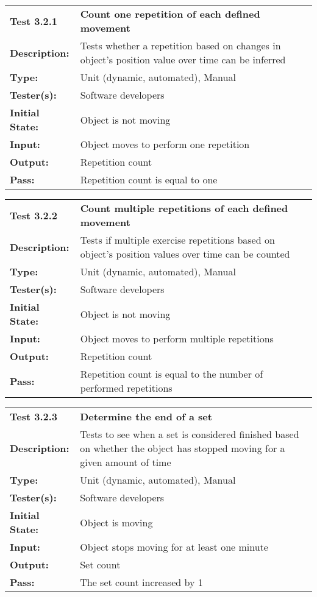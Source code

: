 \documentclass{article}
\newenvironment{testcase}
    {
    \begin{center}
    \begin{mdframed}[
        userdefinedwidth=15.5cm,
        leftmargin=1cm,
        rightmargin=1cm
        ]
    \begin{tabular}{p{2.5cm} p{9cm}}
    }
    {
    \end{tabular}
    \end{mdframed}
    \end{center}
    }
\newcommand{\tctit}[2]{\textbf{#1} & \textbf{#2}}
\newcommand{\tcdesc}{\textbf{Description:}}
\newcommand{\tctype}{\textbf{Type:}}
\newcommand{\testers}{\textbf{Tester(s):}}
\newcommand{\tcinit}{\textbf{Initial State:}}
\newcommand{\tcin}{\textbf{Input:}}
\newcommand{\tcout}{\textbf{Output:}}
\newcommand{\tcpass}{\textbf{Pass:}}
\begin{document}
\begingroup
\begin{testcase}
    \tctit{Test 3.2.1}{Count one repetition of each defined movement} \\
    \tcdesc & Tests whether a repetition based on changes in object's position value over time can be inferred\\
    \tctype & Unit (dynamic, automated), Manual \\
    \testers & Software developers \\
    \tcinit & Object is not moving \\
    \tcin & Object moves to perform one repetition \\
    \tcout & Repetition count\\
    \tcpass & Repetition count is equal to one\\
\end{testcase}
\endgroup

\begingroup
\begin{testcase}
    \tctit{Test 3.2.2}{Count multiple repetitions of each defined movement} \\
    \tcdesc & Tests if multiple exercise repetitions based on object's position values over time can be counted\\
    \tctype & Unit (dynamic, automated), Manual \\
    \testers & Software developers \\
    \tcinit & Object is not moving  \\
    \tcin & Object moves to perform multiple repetitions \\
    \tcout & Repetition count\\
    \tcpass & Repetition count is equal to the number of performed repetitions \\
\end{testcase}
\endgroup

\begingroup
\begin{testcase}
    \tctit{Test 3.2.3}{Determine the end of a set} \\
    \tcdesc & Tests to see when a set is considered finished based on whether the object has stopped moving for a given amount of time \\
    \tctype & Unit (dynamic, automated), Manual \\
    \testers & Software developers \\
    \tcinit & Object is moving \\
    \tcin & Object stops moving for at least one minute \\
    \tcout & Set count \\
    \tcpass & The set count increased by 1 \\
\end{testcase}
\endgroup
\end{document}
